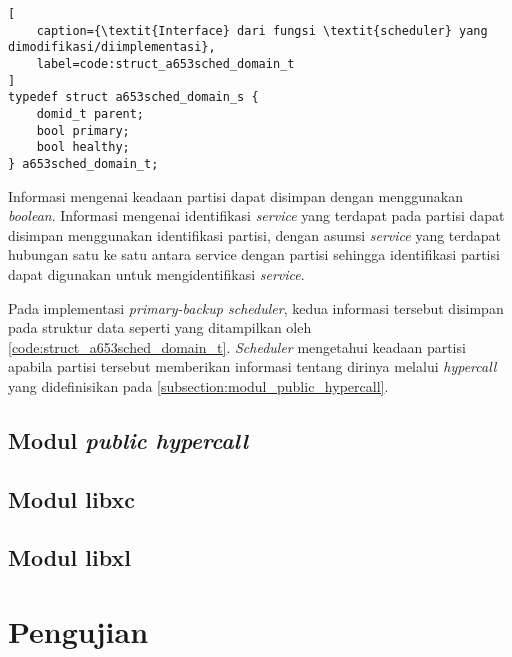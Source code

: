 \begin{lstlisting}[
	caption={\textit{Interface} dari fungsi \textit{scheduler} yang dimodifikasi/diimplementasi},
	label=code:struct_a653sched_domain_t
]
typedef struct a653sched_domain_s {
    domid_t parent;
    bool primary;
    bool healthy;
} a653sched_domain_t;
\end{lstlisting}

Informasi mengenai keadaan partisi dapat disimpan dengan menggunakan \textit{boolean}. Informasi
mengenai identifikasi \textit{service} yang terdapat pada partisi dapat disimpan menggunakan
identifikasi partisi, dengan asumsi \textit{service} yang terdapat hubungan satu ke satu antara
service dengan partisi sehingga identifikasi partisi dapat digunakan untuk mengidentifikasi
\textit{service}.

Pada implementasi \textit{primary-backup scheduler}, kedua informasi tersebut disimpan pada
struktur data seperti yang ditampilkan oleh \autoref{code:struct_a653sched_domain_t}.
\textit{Scheduler} mengetahui keadaan partisi apabila partisi tersebut memberikan informasi
tentang dirinya melalui \textit{hypercall} yang didefinisikan pada
\autoref{subsection:modul_public_hypercall}.

\subsection{Modul \textit{public hypercall}}
\label{subsection:modul_public_hypercall}

\subsection{Modul libxc}
\label{subsection:modul_libxc}

\subsection{Modul libxl}
\label{subsection:modul_libxl}

\section{Pengujian}



